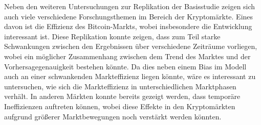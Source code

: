 \documentclass[a4paper, 12pt]{article}
\begin{document}
Neben den weiteren Untersuchungen zur Replikation der Basisstudie zeigen sich auch viele verschiedene Forschungsthemen im Bereich der Kryptomärkte.
Eines davon ist die Effizienz des Bitcoin-Markts, wobei insbesondere die Entwicklung interessant ist.
Diese Replikation konnte zeigen, dass zum Teil starke Schwankungen zwischen den Ergebnissen über verschiedene Zeiträume vorliegen, wobei ein möglicher Zusammenhang zwischen dem Trend des Marktes und der Vorhersagegenauigkeit bestehen könnte.
Da dies neben einem Bias im Modell auch an einer schwankenden Markteffizienz liegen könnte, wäre es interessant zu untersuchen, wie sich die Markteffizienz in unterschiedlichen Marktphasen verhält.
In anderen Märkten konnte bereits gezeigt werden, dass temporäre Ineffizienzen auftreten können, wobei diese Effekte in den Kryptomärkten aufgrund größerer Marktbewegungen noch verstärkt werden könnten.

\newpage

\end{document}
